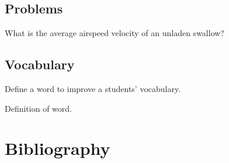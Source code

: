 \documentclass[11pt]{book} %
\begin{document}

\section{Problems}

\begin{problem}
What is the average airspeed velocity of an unladen swallow?
\end{problem}


\section{Vocabulary}

Define a word to improve a students' vocabulary.

\begin{vocabulary}[Word]
Definition of word.
\end{vocabulary}

\fi




\chapter*{Bibliography}


\printbibliography[heading=bibempty]



\end{document}
